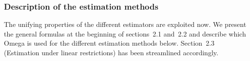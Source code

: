 \documentclass[12pt,english]{scrartcl}
\begin{document}
\subsubsection{Description of the estimation methods}
% 
% 

The unifying properties of the different estimators are exploited now.
We present the general formulas at the beginning of sections~2.1 and~2.2
and describe which Omega is used for the different estimation methods below.
Section~2.3 (Estimation under linear restrictions)
has been streamlined accordingly.
\end{document}

